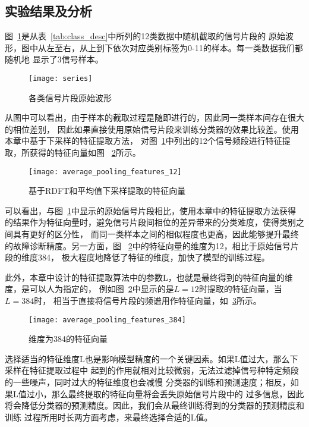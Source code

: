 \subsection{实验结果及分析}

图~\ref{fig:series}是从表~\ref{tab:class_desc}中所列的12类数据中随机截取的信号片段的
原始波形，图中从左至右，从上到下依次对应类别标签为0-11的样本。每一类数据我们都随机地
显示了3信号样本。
\begin{figure}[ht] %
  \centering
  \texttt{[image: series]}
  \caption{各类信号片段原始波形}
  \label{fig:series}
\end{figure}

从图中可以看出，由于样本的截取过程是随即进行的，因此同一类样本间存在很大的相位差别，
因此如果直接使用原始信号片段来训练分类器的效果比较差。使用本章中基于下采样的特征提取方法，
对图~\ref{fig:series}中列出的12个信号频段进行特征提取，所获得的特征向量如图
~\ref{fig:average_pooling_features_12}所示。
\begin{figure}[ht] %
  \centering
  \texttt{[image: average\_pooling\_features\_12]}
  \caption{基于RDFT和平均值下采样提取的特征向量}
  \label{fig:average_pooling_features_12}
\end{figure}

可以看出，与图~\ref{fig:series}中显示的原始信号片段相比，使用本章中的特征提取方法获得
的结果作为特征向量时，避免信号片段间相位的差异带来的分类难度，使得类别之间具有更好的区分性，
而同一类样本之间的相似程度也更高，因此能够提升最终的故障诊断精度。另一方面，图
~\ref{fig:average_pooling_features_12}中的特征向量的维度为12，相比于原始信号片段的维度384，
极大程度地降低了特征的维度，加快了模型的训练过程。

此外，本章中设计的特征提取算法中的参数L，也就是最终得到的特征向量的维度，是可以人为指定的，
例如图~\ref{fig:average_pooling_features_12}中显示的是$L=12$时提取的特征向量，当$L=384$时，
相当于直接将信号片段的频谱用作特征向量，如~\ref{fig:average_pooling_features_384}所示。
\begin{figure}[ht] %
  \centering
  \texttt{[image: average\_pooling\_features\_384]}
  \caption{维度为384的特征向量}
  \label{fig:average_pooling_features_384}
\end{figure}

选择适当的特征维度L也是影响模型精度的一个关键因素。如果L值过大，那么下采样在特征提取过程中
起到的作用就相对比较微弱，无法过滤掉信号种特定频段的一些噪声，同时过大的特征维度也会减慢
分类器的训练和预测速度；相反，如果L值过小，那么最终提取的特征向量将会丢失原始信号片段中的
过多信息，因此将会降低分类器的预测精度。因此，我们会从最终训练得到的分类器的预测精度和训练
过程所用时长两方面考虑，来最终选择合适的L值。

